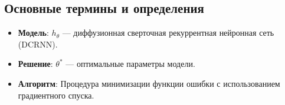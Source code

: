 \documentclass[12pt, twoside]{article}
\begin{document}
\subsection{Основные термины и определения}
\begin{itemize}
    \item \textbf{Модель}: \( h_\theta \) — диффузионная сверточная рекуррентная нейронная сеть (DCRNN).
    \item \textbf{Решение}: \( \theta^* \) — оптимальные параметры модели.
    \item \textbf{Алгоритм}: Процедура минимизации функции ошибки с использованием градиентного спуска.
\end{itemize}





\end{document}
